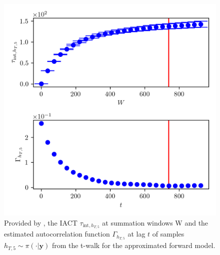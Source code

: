 \begin{figure}[ht!]
	\centering
	\includegraphics{UwerrTauIntTWalk14.png}
	\caption[IACT and autocorrelation function of samples $h_{T,5} \sim \pi(\cdot|\bm{y})$, for approximated model.]{Provided by \cite{drikHesse}, the IACT $\tau_{\text{int},h_{T,5}}$ at summation windows W and the estimated autocorrelation function $\Gamma_{h_{T,5}}$ at lag $t$ of samples $h_{T,5} \sim \pi( \cdot| \bm{y})$ from the t-walk for the approximated forward model.}
	\label{fig:TWalkIATC15}
\end{figure}

